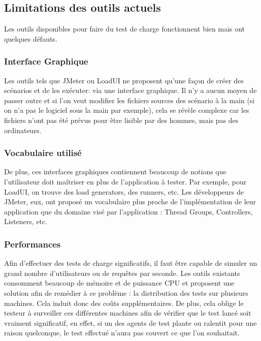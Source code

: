 \subsection{Limitations des outils actuels}
Les outils disponibles pour faire du test de charge fonctionnent bien mais ont quelques défauts.
\subsubsection{Interface Graphique}
Les outils tels que JMeter ou LoadUI ne proposent qu'une façon de créer des scénarios et de les exécuter: via une interface graphique. Il n'y a aucun moyen de passer outre et si l'on veut modifier les fichiers sources des scénario à la main (si on n'a pas le logiciel sous la main par exemple), cela se révèle complexe car les fichiers n'ont pas été prévus pour être lisible par des hommes, mais pas des ordinateurs.

\subsubsection{Vocabulaire utilisé}
De plus, ces interfaces graphiques contiennent beaucoup de notions que l'utilisateur doit maîtriser en plus de l'application à tester. Par exemple, pour LoadUI, on trouve des load generators, des runners, etc. Les développeurs de JMeter, eux, ont proposé un vocabulaire plus proche de l'implémentation de leur application que du domaine visé par l'application : Thread Groups, Controllers, Listeners, etc.

\subsubsection{Performances}
\label{pb_perfs}
Afin d'effectuer des tests de charge significatifs, il faut être capable de simuler un grand nombre d'utilisateurs ou de requêtes par seconde. Les outils existants consomment beaucoup de mémoire et de puissance CPU et proposent une solution afin de remédier à ce problème : la distribution des tests sur plusieurs machines. Cela induit donc des coûts supplémentaires. De plus, cela oblige le testeur à surveiller ces différentes machines afin de vérifier que le test lancé soit vraiment significatif, en effet, si un des agents de test plante ou ralentit pour une raison quelconque, le test effectué n'aura pas couvert ce que l'on souhaitait.

